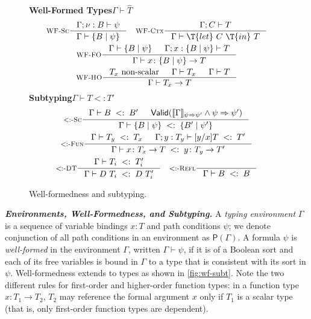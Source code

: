 \documentclass[10pt,preprint]{sigplanconf-pldi16}
\theoremstyle{definition}
\newcommand{\custompar}[1]{\parskip 0pt \textbf{\textit{#1}}}
\newcommand{\Implies}{\Rightarrow}
\renewcommand{\And}{\wedge}
\newcommand{\Subt}{<:}
\newcommand{\env}{\Gamma}
\newcommand{\funT}[3]{{#1}\colon {#2} \to {#3}}
\newcommand{\pathc}[1]{\mathsf{P}({#1})}
\newcommand{\contT}[2]{\T{let}\ {#1}\ \T{in}\ {#2}}
\begin{document}
\begin{figure}
\small
\textbf{Well-Formed Types}\quad$\boxed{\env \vdash \hat{T}}$
\begin{gather*}
\inference[\textsc{WF-Sc}]
{\env;\nu:B \vdash \psi}
{\env \vdash \{B\mid \psi\} }
\quad
\inference[\textsc{WF-Ctx}]
{\env;C\vdash T}
{\env \vdash \contT{C}{T}}
\\
\inference[\textsc{WF-FO}]
{\env\vdash\{B\mid \psi\} & \env;x:\{B\mid \psi\} \vdash T}
{\env \vdash \funT{x}{\{B\mid \psi\}}{T} }
\\
\inference[\textsc{WF-HO}]
{T_x\ \text{non-scalar} & \env \vdash T_x & \env \vdash T}
{\env \vdash T_x \to T }
\end{gather*}
\textbf{Subtyping}\quad$\boxed{\env \vdash T\Subt T'}$
\begin{gather*}
\inference[\textsc{$\Subt$-Sc}]
{\env \vdash B\;\Subt\; B' & \mathsf{Valid}(\llbracket\env\rrbracket_{\psi\Implies\psi'}\And\psi\Implies\psi')}
{\env \vdash \{B\mid \psi\} \;\Subt\; \{B'\mid \psi'\} }
\\
\inference[\textsc{$\Subt$-Fun}]
{\env\vdash T_y\;\Subt\; T_x & \env;y: T_y \vdash [y/x]T\;\Subt\; T'}
{\env \vdash \funT{x}{T_x}{T} \;\Subt\; \funT{y}{T_y}{T'} }
\\
\inference[\textsc{$\Subt$-DT}]
{\env\vdash T_i \;\Subt\; T'_i}
{\env \vdash D\ T_i \;\Subt\; D\ T'_i}
\quad
\inference[\textsc{$\Subt$-Refl}]
{}
{\env \vdash B \;\Subt\; B}
\end{gather*}
\caption{Well-formedness and subtyping.}\label{fig:wf-subt}
\end{figure}

\custompar{Environments, Well-Formedness, and Subtyping.}
A \emph{typing environment} $\env$ is a sequence of
variable bindings $x: T$ and path conditions $\psi$;
we denote conjunction of all path conditions in an environment as $\pathc{\env}$.
A formula $\psi$ is \emph{well-formed} in the environment $\env$,
written $\env \vdash \psi$,
if it is of a Boolean sort and each of its free variables is bound in $\env$ to a type that is consistent with its sort in $\psi$.  
Well-formedness extends to types as shown in \autoref{fig:wf-subt}.
Note the two different rules for first-order and higher-order function types:
in a function type $\funT{x}{T_1}{T_2}$, $T_2$ may reference the formal argument $x$ only if $T_1$ is a scalar type
(that is, only first-order function types are dependent).
\end{document}
